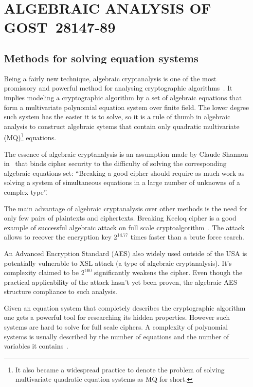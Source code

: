 % 
% 

\chapter{ALGEBRAIC ANALYSIS OF GOST~28147-89}
\label{sec:algebraic}

\section{Methods for solving equation systems}

Being a fairly new technique, algebraic cryptanalysis is one of the most
promissory and powerful method for analysing cryptographic
algorithms~\cite{Albrecht2010}. It implies modeling a cryptographic algorithm
by a set of algebraic equations that form a multivariate polynomial equation
system over finite field. The lower degree such system has the easier it is to
solve, so it is a rule of thumb in algebraic analysis to construct algebraic
sytems that contain only quadratic multivariate (MQ)\footnote{It also became a
widespread practice to denote the problem of solving multivariate quadratic
equation systems as MQ for short.} equations.

The essence of algebraic cryptanalysis is an assumption made by Claude Shannon
in~\cite{shannon:secrecy} that binds cipher security to the difficulty of
solving the corresponding algebraic equations set:
``Breaking a good cipher should require as much work as solving a system of
simultaneous equations in a large number of unknowns of a complex
type''.

The main advantage of algebraic cryptanalysis over other methods is the need
for only few pairs of plaintexts and ciphertexts. Breaking Keeloq cipher is
a good example of successful algebraic attack on full scale
cryptoalgorithm~\cite{bard2009algebraic}. The attack allows to recover the
encryption key $2^{14.77}$ times faster than a brute force search.

An Advanced Encryption Standard (AES) also widely used outside of the USA is
potentially vulnerable to XSL attack (a type of algebraic cryptanalysis).
It's complexity claimed to be $2^{100}$ significantly weakens the cipher. Even
though the practical applicability of the attack hasn't yet been proven, the
algebraic AES structure compliance to such analysis.


Given an equation system that completely describes the cryptographic algorithm
one gets a powerful tool for researching its hidden properties. However such
systems are hard to solve for full scale ciphers. A complexity of polynomial
systems is usually described by the number of equations and the number of
variables it contains~\cite{bard2009algebraic}. 

